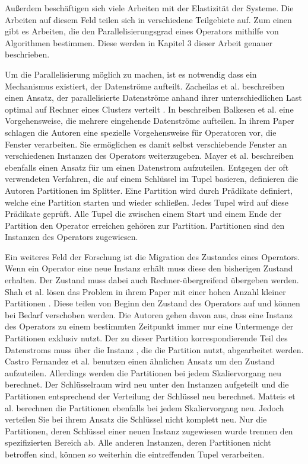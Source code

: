 Außerdem beschäftigen sich viele Arbeiten mit der Elastizität der Systeme.
Die Arbeiten auf diesem Feld teilen sich in verschiedene Teilgebiete auf.
Zum einen gibt es Arbeiten, die den Parallelisierungsgrad eines Operators mithilfe von Algorithmen bestimmen. Diese werden in Kapitel 3 dieser Arbeit genauer beschrieben.

Um die Parallelisierung möglich zu machen, ist es notwendig dass ein Mechanismus existiert, der Datenströme aufteilt.
Zacheilas et al. beschreiben einen Ansatz, der parallelisierte Datenströme anhand ihrer unterschiedlichen Last optimal auf Rechner eines Clusters verteilt \cite{zacheilas_dynamic_2016}.
In \cite{balkesen_adaptive_2013} beschreiben Balkesen et al. eine Vorgehensweise, die mehrere eingehende Datenströme aufteilen.
In ihrem Paper schlagen die Autoren eine spezielle Vorgehensweise für Operatoren vor, die Fenster verarbeiten.
Sie ermöglichen es damit selbst verschiebende Fenster an verschiedenen Instanzen des Operators weiterzugeben.
Mayer et al. \cite{mayer_predictable_2015} beschreiben ebenfalls einen Ansatz für um einen Datenstrom aufzuteilen.
Entgegen der oft verwendeten Verfahren, die auf einem Schlüssel im Tupel basieren, definieren die Autoren Partitionen im Splitter.
Eine Partition wird durch Prädikate definiert, welche eine Partition starten und wieder schließen.
Jedes Tupel wird auf diese Prädikate geprüft.
Alle Tupel die zwischen einem Start und einem Ende der Partition den Operator erreichen gehören zur Partition.
Partitionen sind den Instanzen des Operators zugewiesen.

Ein weiteres Feld der Forschung ist die Migration des Zustandes eines Operators.
Wenn ein Operator eine neue Instanz erhält muss diese den bisherigen Zustand erhalten.
Der Zustand muss dabei auch Rechner-übergreifend übergeben werden.
Shah et al. lösen das Problem in ihrem Paper mit einer hohen Anzahl kleiner Partitionen \cite{shah_flux:_2003}.
Diese teilen von Beginn den Zustand des Operators auf und können bei Bedarf verschoben werden.
Die Autoren gehen davon aus, dass eine Instanz des Operators zu einem bestimmten Zeitpunkt immer nur eine Untermenge der Partitionen exklusiv nutzt.
Der zu dieser Partition korrespondierende Teil des Datenstroms muss über die Instanz , die die Partition nutzt, abgearbeitet werden.
Castro Fernandez et al. \cite{castro_fernandez_integrating_2013} benutzen einen ähnlichen Ansatz um den Zustand aufzuteilen.
Allerdings werden die Partitionen bei jedem Skaliervorgang neu berechnet.
Der Schlüsselraum wird neu unter den Instanzen aufgeteilt und die Partitionen entsprechend der Verteilung der Schlüssel neu berechnet.
Matteis et al. \cite{de_matteis_keep_2016} berechnen die Partitionen ebenfalls bei jedem Skaliervorgang neu.
Jedoch verteilen Sie bei ihrem Ansatz die Schlüssel nicht komplett neu.
Nur die Partitionen, deren Schlüssel einer neuen Instanz zugewiesen wurde trennen den spezifizierten Bereich ab.
Alle anderen Instanzen, deren Partitionen nicht betroffen sind, können so weiterhin die eintreffenden Tupel verarbeiten.

